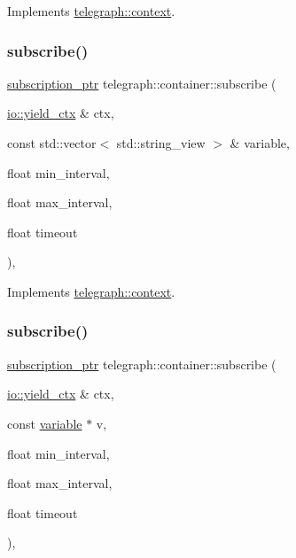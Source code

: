 Implements \hyperlink{classtelegraph_1_1context_a6765d7fa22fe99b9a6723c511396b781}{telegraph\+::context}.

\mbox{\label{classtelegraph_1_1container_ae1ae26a08bf3d367bbc13020623780b2}} 
\subsubsection{\texorpdfstring{subscribe()}{subscribe()}\hspace{0.1cm}{\footnotesize\ttfamily [1/2]}}
{\footnotesize\ttfamily \hyperlink{namespacetelegraph_a58641aa5b1a2cbdb0431916a87069f64}{subscription\+\_\+ptr} telegraph\+::container\+::subscribe (\begin{DoxyParamCaption}\item[{\hyperlink{structboost_1_1asio_1_1yield__ctx}{io\+::yield\+\_\+ctx} \&}]{ctx,  }\item[{const std\+::vector$<$ std\+::string\+\_\+view $>$ \&}]{variable,  }\item[{float}]{min\+\_\+interval,  }\item[{float}]{max\+\_\+interval,  }\item[{float}]{timeout }\end{DoxyParamCaption})\hspace{0.3cm}{\ttfamily [override]}, {\ttfamily [virtual]}}



Implements \hyperlink{classtelegraph_1_1context_a8db167973f187f707a4108e112683969}{telegraph\+::context}.

\mbox{\label{classtelegraph_1_1container_aa11f4e622d784b566a032c05f2019264}} 
\subsubsection{\texorpdfstring{subscribe()}{subscribe()}\hspace{0.1cm}{\footnotesize\ttfamily [2/2]}}
{\footnotesize\ttfamily \hyperlink{namespacetelegraph_a58641aa5b1a2cbdb0431916a87069f64}{subscription\+\_\+ptr} telegraph\+::container\+::subscribe (\begin{DoxyParamCaption}\item[{\hyperlink{structboost_1_1asio_1_1yield__ctx}{io\+::yield\+\_\+ctx} \&}]{ctx,  }\item[{const \hyperlink{classtelegraph_1_1variable}{variable} $\ast$}]{v,  }\item[{float}]{min\+\_\+interval,  }\item[{float}]{max\+\_\+interval,  }\item[{float}]{timeout }\end{DoxyParamCaption})\hspace{0.3cm}{\ttfamily [override]}, {\ttfamily [virtual]}}



